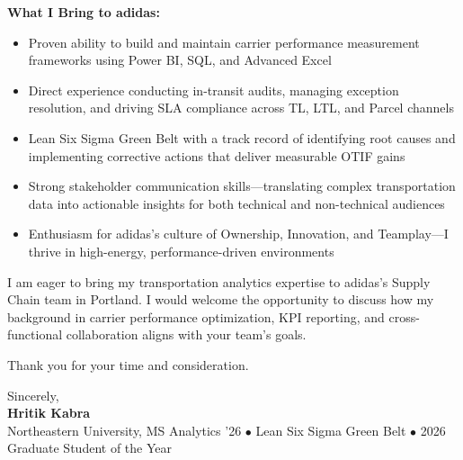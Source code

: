 \documentclass[letterpaper,10pt]{article}
\begin{document}
\textbf{What I Bring to adidas:}

\begin{itemize}[leftmargin=0.15in, label=$\bullet$, itemsep=2pt]
\item \small{Proven ability to build and maintain carrier performance measurement frameworks using Power BI, SQL, and Advanced Excel}
\item \small{Direct experience conducting in-transit audits, managing exception resolution, and driving SLA compliance across TL, LTL, and Parcel channels}
\item \small{Lean Six Sigma Green Belt with a track record of identifying root causes and implementing corrective actions that deliver measurable OTIF gains}
\item \small{Strong stakeholder communication skills---translating complex transportation data into actionable insights for both technical and non-technical audiences}
\item \small{Enthusiasm for adidas's culture of Ownership, Innovation, and Teamplay---I thrive in high-energy, performance-driven environments}
\end{itemize}

I am eager to bring my transportation analytics expertise to adidas's Supply Chain team in Portland. I would welcome the opportunity to discuss how my background in carrier performance optimization, KPI reporting, and cross-functional collaboration aligns with your team's goals.

Thank you for your time and consideration.

\vspace{12pt}

Sincerely,\\
\textbf{Hritik Kabra}\\
\small{Northeastern University, MS Analytics '26 $\bullet$ Lean Six Sigma Green Belt $\bullet$ 2026 Graduate Student of the Year}
\end{document}
